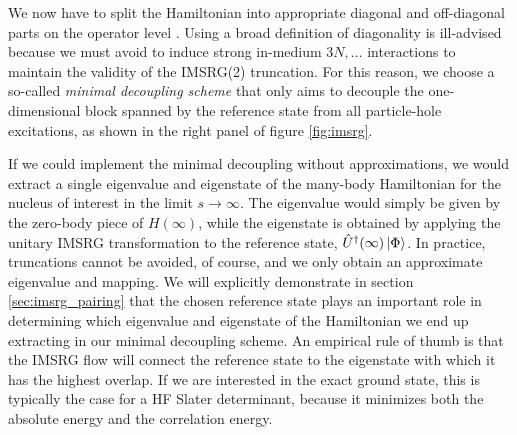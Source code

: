 We now have to split the Hamiltonian into appropriate diagonal and off-diagonal 
parts on the operator level \cite{Kutzelnigg:1982ly,Kutzelnigg:1983ve,Kutzelnigg:1984qf}. 
Using a broad definition of diagonality is ill-advised because we must 
avoid to induce strong in-medium $3N, \ldots$ interactions to maintain the
validity of the IMSRG(2) truncation. For this reason, we choose a so-called 
\emph{minimal decoupling scheme} that only aims to decouple the one-dimensional 
block spanned by the reference state from all particle-hole excitations, as
shown in the right panel of figure \ref{fig:imsrg}. 

If we could implement the minimal decoupling without approximations, 
we would extract a single eigenvalue and eigenstate of the many-body Hamiltonian
for the nucleus of interest in the limit $s\to\infty$. The eigenvalue
would simply be given by the zero-body piece of $H(\infty)$, while the eigenstate
is obtained by applying the unitary IMSRG transformation to the reference
state, $\hat{U}^\dag(\infty)\,|{\Phi}\rangle$. In practice, truncations cannot be
avoided, of course, and we only obtain an approximate eigenvalue and 
mapping. We will explicitly demonstrate in section \ref{sec:imsrg_pairing}
that the chosen reference state plays an important role in determining
which eigenvalue and eigenstate of the Hamiltonian we end up extracting
in our minimal decoupling scheme. An empirical rule of thumb is that the 
IMSRG flow will connect the reference state to the eigenstate with which 
it has the highest overlap. If we are interested in the exact ground state, 
this is typically the case for a HF Slater determinant, because it minimizes 
both the absolute energy and the correlation energy. 

